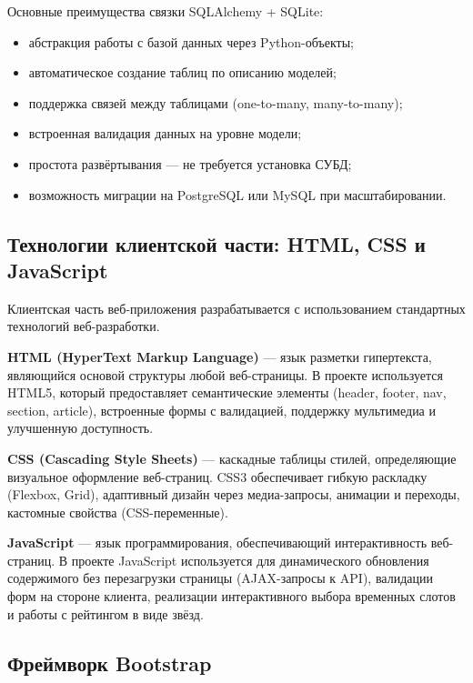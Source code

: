\documentclass[14pt,a4paper,oneside]{extarticle}
\begin{document}
Основные преимущества связки SQLAlchemy + SQLite:
\begin{itemize}[leftmargin=2cm]
    \item абстракция работы с базой данных через Python-объекты;
    \item автоматическое создание таблиц по описанию моделей;
    \item поддержка связей между таблицами (one-to-many, many-to-many);
    \item встроенная валидация данных на уровне модели;
    \item простота развёртывания --- не требуется установка СУБД;
    \item возможность миграции на PostgreSQL или MySQL при масштабировании.
\end{itemize}

\subsection{Технологии клиентской части: HTML, CSS и JavaScript}

Клиентская часть веб-приложения разрабатывается с использованием стандартных технологий веб-разработки.

\textbf{HTML (HyperText Markup Language)} --- язык разметки гипертекста, являющийся основой структуры любой веб-страницы. В проекте используется HTML5, который предоставляет семантические элементы (header, footer, nav, section, article), встроенные формы с валидацией, поддержку мультимедиа и улучшенную доступность.

\textbf{CSS (Cascading Style Sheets)} --- каскадные таблицы стилей, определяющие визуальное оформление веб-страниц. CSS3 обеспечивает гибкую раскладку (Flexbox, Grid), адаптивный дизайн через медиа-запросы, анимации и переходы, кастомные свойства (CSS-переменные).

\textbf{JavaScript} --- язык программирования, обеспечивающий интерактивность веб-страниц. В проекте JavaScript используется для динамического обновления содержимого без перезагрузки страницы (AJAX-запросы к API), валидации форм на стороне клиента, реализации интерактивного выбора временных слотов и работы с рейтингом в виде звёзд.

\subsection{Фреймворк Bootstrap}
\end{document}
